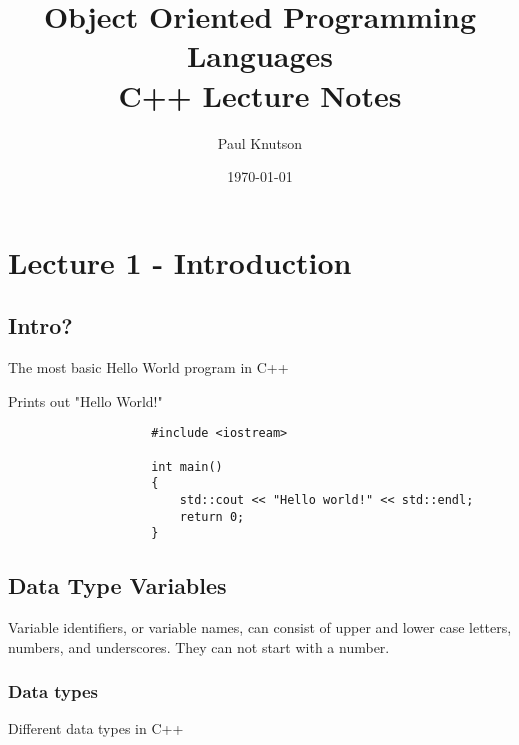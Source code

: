 \documentclass{report}
\begin{document}
	\title{Object Oriented Programming Languages\\C++ Lecture Notes}
	\date{\today}
	\author{Paul Knutson}
	\maketitle
	\clearpage
	\tableofcontents{}
	\clearpage
	
	
	\chapter{Lecture 1 - Introduction}
	
		
		
		
		\section{Intro?}
			The most basic Hello World program in C++ \\
			
			\begin{minipage}{\linewidth}
				Prints out "Hello World!"
				\begin{lstlisting}
					#include <iostream>
					
					int main()
					{
						std::cout << "Hello world!" << std::endl;
						return 0;
					}
				\end{lstlisting}
			\end{minipage}
		
		
		\section{Data Type Variables}
			Variable identifiers, or variable names, can consist of upper and lower case letters, numbers, and underscores.
			They can not start with a number. \\
			
			\subsection{Data types}
				Different data types in C++ \\
				
\end{document}
